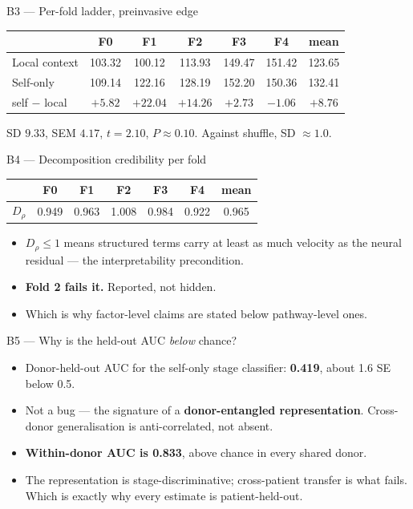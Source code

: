 \documentclass[aspectratio=169,10pt]{beamer}
\begin{document}
\begin{frame}{B3 --- Per-fold ladder, preinvasive edge}
  \begin{center}\small\begin{tabular}{lccccc c}
    \toprule & F0 & F1 & F2 & F3 & F4 & mean\\ \midrule
    Local context & 103.32 & 100.12 & 113.93 & 149.47 & 151.42 & 123.65\\
    Self-only & 109.14 & 122.16 & 128.19 & 152.20 & 150.36 & 132.41\\
    \midrule
    self $-$ local & $+5.82$ & $+22.04$ & $+14.26$ & $+2.73$ & \color{bad}$-1.06$ & $+8.76$\\
    \bottomrule
  \end{tabular}\end{center}
  \vspace{.6em}\small
  SD $9.33$, SEM $4.17$, $t=2.10$, $P\approx0.10$. Against shuffle,
  SD $\approx1.0$.
\end{frame}

\begin{frame}{B4 --- Decomposition credibility per fold}
  \begin{center}\small\begin{tabular}{lccccc c}
    \toprule & F0 & F1 & F2 & F3 & F4 & mean\\ \midrule
    $D_\rho$ & 0.949 & 0.963 & \color{bad}1.008 & 0.984 & 0.922 & 0.965\\
    \bottomrule
  \end{tabular}\end{center}
  \vspace{.8em}
  \begin{itemize}\small
    \item $D_\rho \le 1$ means structured terms carry at least as much velocity as
          the neural residual --- the interpretability precondition.
    \item \textbf{Fold 2 fails it.} Reported, not hidden.
    \item Which is why factor-level claims are stated below pathway-level ones.
  \end{itemize}
\end{frame}

\begin{frame}{B5 --- Why is the held-out AUC \emph{below} chance?}
  \begin{itemize}\small
    \item Donor-held-out AUC for the self-only stage classifier: \textbf{0.419},
          about 1.6 SE below 0.5.
    \item Not a bug --- the signature of a \textbf{donor-entangled
          representation}. Cross-donor generalisation is anti-correlated, not
          absent.
    \item \textbf{Within-donor AUC is 0.833}, above chance in every shared donor.
    \item The representation is stage-discriminative; cross-patient transfer is
          what fails. Which is exactly why every estimate is patient-held-out.
  \end{itemize}
\end{frame}
\end{document}

